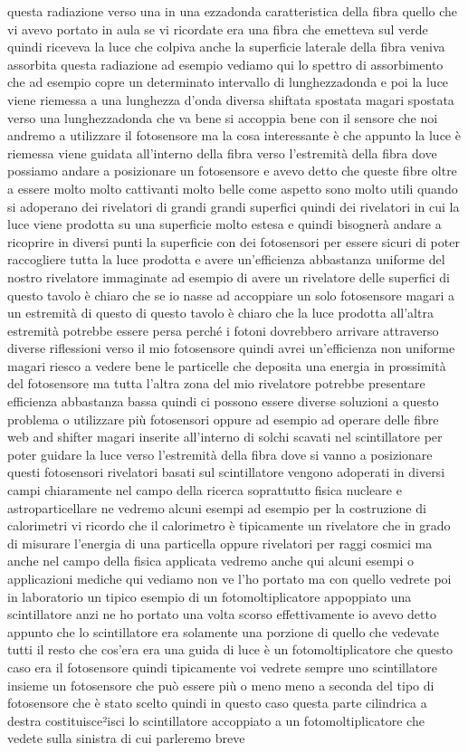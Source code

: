 {questa radiazione verso una in una ezzadonda caratteristica della fibra quello che vi avevo portato in aula se vi ricordate era una fibra che emetteva sul verde quindi riceveva la luce che colpiva anche la superficie laterale della fibra veniva assorbita questa radiazione ad esempio vediamo qui lo spettro di assorbimento che ad esempio copre un determinato intervallo di lunghezzadonda e poi la luce viene riemessa a una lunghezza d'onda diversa shiftata spostata magari spostata verso una lunghezzadonda che va bene si accoppia bene con il sensore che noi andremo a utilizzare il fotosensore ma la cosa interessante è che appunto la luce è riemessa viene guidata all'interno della fibra verso l'estremità della fibra dove possiamo andare a posizionare un fotosensore e avevo detto che queste fibre oltre a essere molto molto cattivanti molto belle come aspetto sono molto utili quando si adoperano dei rivelatori di grandi grandi superfici quindi dei rivelatori in cui la luce viene prodotta su una superficie molto estesa e quindi bisognerà andare a ricoprire in diversi punti la superficie con dei fotosensori per essere sicuri di poter raccogliere tutta la luce prodotta e avere un'efficienza abbastanza uniforme del nostro rivelatore immaginate ad esempio di avere un rivelatore delle superfici di questo tavolo è chiaro che se io nasse ad accoppiare un solo fotosensore magari a un estremità di questo di questo tavolo è chiaro che la luce prodotta all'altra estremità potrebbe essere persa perché i fotoni dovrebbero arrivare attraverso diverse riflessioni verso il mio fotosensore quindi avrei un'efficienza non uniforme magari riesco a vedere bene le particelle che deposita una energia in prossimità del fotosensore ma tutta l'altra zona del mio rivelatore potrebbe presentare efficienza abbastanza bassa quindi ci possono essere diverse soluzioni a questo problema o utilizzare più fotosensori oppure ad esempio ad operare delle fibre web and shifter magari inserite all'interno di solchi scavati nel scintillatore per poter guidare la luce verso l'estremità della fibra dove si vanno a posizionare questi fotosensori rivelatori basati sul scintillatore vengono adoperati in diversi campi chiaramente nel campo della ricerca soprattutto fisica nucleare e astroparticellare ne vedremo alcuni esempi ad esempio per la costruzione di calorimetri vi ricordo che il calorimetro è tipicamente un rivelatore che in grado di misurare l'energia di una particella oppure rivelatori per raggi cosmici ma anche nel campo della fisica applicata vedremo anche qui alcuni esempi o applicazioni mediche qui vediamo non ve l'ho portato ma con quello vedrete poi in laboratorio un tipico esempio di un fotomoltiplicatore appoppiato una scintillatore anzi ne ho portato una volta scorso effettivamente io avevo detto appunto che lo scintillatore era solamente una porzione di quello che vedevate tutti il resto che cos'era era una guida di luce è un fotomoltiplicatore che questo caso era il fotosensore quindi tipicamente voi vedrete sempre uno scintillatore insieme un fotosensore che può essere più o meno meno a seconda del tipo di fotosensore che è stato scelto quindi in questo caso questa parte cilindrica a destra costituisce²isci lo scintillatore accoppiato a un fotomoltiplicatore che vedete sulla sinistra di cui parleremo breve }
